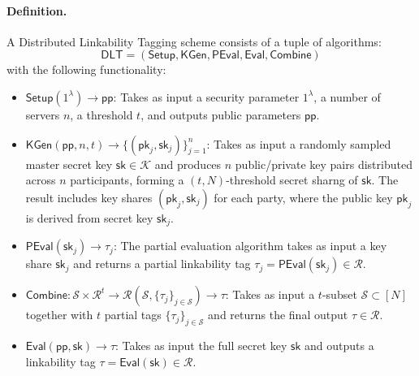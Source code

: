 \paragraph{Definition.} A Distributed Linkability Tagging scheme consists of a tuple of algorithms:
\[
{\mathsf{DLT}} = (\mathsf{Setup}, \mathsf{KGen}, \mathsf{PEval}, \mathsf{Eval}, \mathsf{Combine})
\]
with the following functionality:
\begin{itemize}
    \item $\mathsf{Setup}(1^\lambda) \rightarrow \mathsf{pp}$: Takes as input a security parameter $1^\lambda$, a number of servers $n$, a threshold $t$, and outputs public parameters $\mathsf{pp}$.
    
     \item $\mathsf{KGen}(\mathsf{pp}, n, t) \rightarrow \{(\mathsf{pk}_j, \mathsf{sk}_j)\}_{j=1}^n$: Takes as input a randomly sampled master secret key $\mathsf{sk} \in \mathcal{K}$ and produces $n$ public/private key pairs distributed across $n$ participants, forming a $(t,N)$-threshold secret sharng of $\mathsf{sk}$. The result includes key shares $(\mathsf{pk}_j, \mathsf{sk}_j)$ for each party, where the public key $\mathsf{pk}_j$ is derived from secret key $\mathsf{sk}_j$.

     \item $\mathsf{PEval}(\mathsf{sk}_j) \rightarrow \tau_j$: The partial evaluation algorithm takes as input a key share $\mathsf{sk}_j$ and returns a partial linkability tag $\tau_j = \mathsf{PEval}(\mathsf{sk}_j) \in \mathcal{R}$.

     \item $\mathsf{Combine} : \mathcal{S} \times \mathcal{R}^t \rightarrow \mathcal{R} (\mathcal{S},\{\tau_j\}_{j \in \mathcal{S}}) \rightarrow \tau$: Takes as input a $t$-subset $\mathcal{S} \subset [N]$ together with $t$ partial tags $\{\tau_j\}_{j \in \mathcal{S}}$ and returns the final output $\tau \in \mathcal{R}$.

     \item $\mathsf{Eval}(\mathsf{pp}, \mathsf{sk}) \rightarrow \tau$: Takes as input the full secret key $\mathsf{sk}$ and outputs a linkability tag $\tau= \mathsf{Eval}(\mathsf{sk}) \in \mathcal{R}$.
      
\end{itemize}


